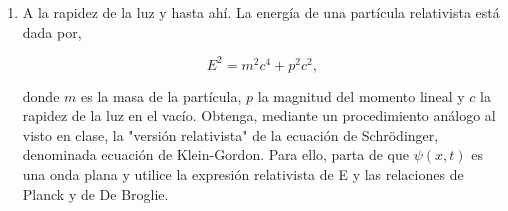 \documentclass[12pt,a4paper]{article}
\begin{document}
\begin{enumerate}
\begin{enumerate}
Considérese a,

\[
\psi^{*}(x, 0) = \begin{cases}
A(x/a), & 0 \leq x \leq a, \\
A(b-x)/(b-a), & a \leq x \leq b, \\
0, & \mathrm{en \,\, otro \,\, caso,}
\end{cases}
\]

por lo que,

\[
\langle \hat{x} \rangle = \int_{-\infty}^{0} 0 \, dx + \int_{0}^{a} A\frac{x}{a} x \frac{x}{a} \, dx + \int_{a}^{b} A \frac{b-x}{b-a}x \frac{b-x}{b-a} \, dx
\]


\[
= \int_{0}^{a} A^{2}\frac{x^{3}}{a^{2}} \, dx + \int_{a}^{b} A^{2}\frac{(b-x)^{2}}{(b-a)^{2}}x \, dx
\]

\[
= \frac{A^{2}}{a^{2}}\frac{x^{4}}{4}\bigg |_{0}^{a} - \frac{A^{2}}{(b-a)^{2}} \int_{a}^{b} b^{2}x-2bx^{2}+x^{3} \, dx
\]

\[
\frac{A^{2}}{a^{2}}\frac{a^{4}}{4} - \frac{A^{2}}{(b-a)^{2}} \left[ \frac{b^{2}x^{2}}{2}-\frac{2bx^{3}}{3}+\frac{x^{4}}{4} \right]_{a}^{b}
\]

Tomando solo el corchete,

\[
\left[ \frac{b^{2}x^{2}}{2}-\frac{2bx^{3}}{3}+\frac{x^{4}}{4} \right]_{a}^{b} = \left[ x^{2}\left( \frac{b^{2}x^{2}}{2}-\frac{2bx^{3}}{3}+\frac{x^{4}}{4} \right) \right]_{a}^{b}
\]


\[
\left[ b^{2}\left( \frac{b^{2}}{2}-\frac{2b^{2}}{3}+\frac{b^{2}}{4} \right)+a^{2}\left( \frac{b^{2}}{2}-\frac{2ab}{3}+\frac{a^{2}}{4} \right) \right]
\]

\[
\frac{b^{4}}{12} + \frac{a^{2}b^{2}}{2} - \frac{2a^{3}b}{3} + \frac{a^{4}}{4} = \frac{b^{4}+6a^{2}b^{2}-8a^{3}b+3a^{4}}{12}
\]

Volviendo a la expresión, 

\[
\langle \hat{x} \rangle = A^{2}\left( \frac{a^{2}}{4} -  \frac{b^{4}+6a^{2}b^{2}-8a^{3}b+3a^{4}}{12(b-a)^{2}}\right)
\]

Tras mucha simplificación,

\[
\langle \hat{x} \rangle = \frac{b^{2}-2ab+2a^{2}}{4(b-a)}
\]


\end{enumerate}

\item A la rapidez de la luz y hasta ahí.
La energía de una partícula relativista está dada por,

\[
E^{2} = m^{2} c^{4} + p^{2} c^{2},
\]

donde $ m $ es la masa de la partícula, $ p $ la magnitud del momento lineal y $ c $ la rapidez de la luz en el vacío. Obtenga, mediante un procedimiento análogo al visto en clase, la "versión relativista" de la ecuación de Schr\"odinger, denominada ecuación de Klein-Gordon. Para ello, parta de que $ \psi(x,t) $ es una onda plana y utilice la expresión relativista de E y las relaciones de Planck y de De Broglie. 


\end{enumerate}
\end{document}
